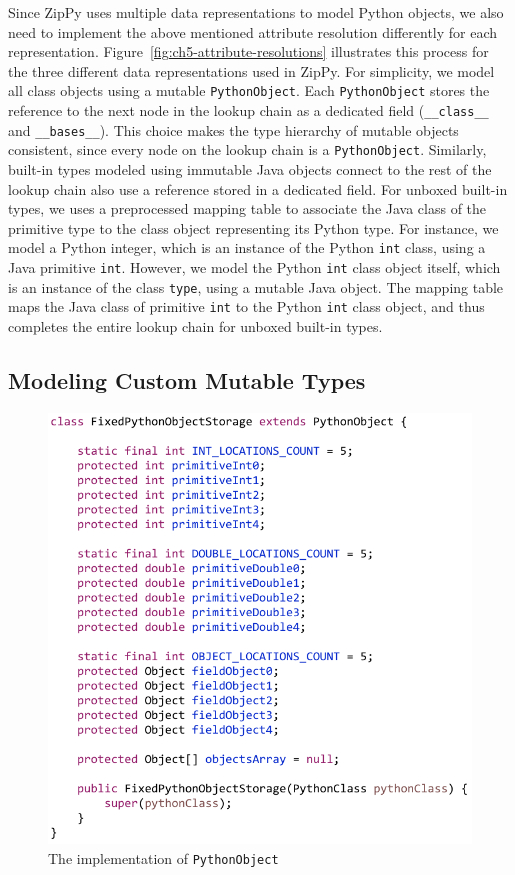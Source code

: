 Since ZipPy uses multiple data representations to model Python objects, we also need to implement the above mentioned attribute resolution differently for each representation.
Figure~\ref{fig:ch5-attribute-resolutions} illustrates this process for the three different data representations used in ZipPy.
For simplicity, we model all class objects using a mutable \texttt{PythonObject}.
Each \texttt{PythonObject} stores the reference to the next node in the lookup chain as a dedicated field (\texttt{\_\_class\_\_} and \texttt{\_\_bases\_\_}).
This choice makes the type hierarchy of mutable objects consistent, since every node on the lookup chain is a \texttt{PythonObject}.
Similarly, built-in types modeled using immutable Java objects connect to the rest of the lookup chain also use a reference stored in a dedicated field.
For unboxed built-in types, we uses a preprocessed mapping table to associate the Java class of the primitive type to the class object representing its Python type.
For instance, we model a Python integer, which is an instance of the Python \texttt{int} class, using a Java primitive \texttt{int}.
However, we model the Python \texttt{int} class object itself, which is an instance of the class \texttt{type}, using a mutable Java object.
The mapping table maps the Java class of primitive \texttt{int} to the Python \texttt{int} class object, and thus completes the entire lookup chain for unboxed built-in types.

\subsection{Modeling Custom Mutable Types}
\label{sec:ch5-custom-mutable-types}

\begin{figure}
\centering
\includegraphics[scale=1.]{figures/ch5-fixed-python-object-code}
\caption{The implementation of \texttt{PythonObject}}
\label{ch5-fixed-python-object-code}
\end{figure}

